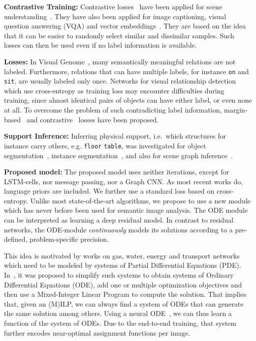 \documentclass[runningheads]{llncs}
\begin{document}
\noindent \textbf{Contrastive Training:} Contrastive losses~\cite{arora2019theoretical} have been applied for scene understanding~\cite{Zhang2019:GCL}. They have also been applied for image captioning, visual question answering (VQA) and vector embeddings~\cite{yang2018shuffle,nagaraja2016modeling,rohrbach2016grounding}. They are based on the idea that it can be easier to randomly select similar and dissimilar samples. Such losses can then be used even if no label information is available.

\noindent \textbf{Losses:} In Visual Genome~\cite{krishna2017visual}, many semantically meaningful relations are not labeled. Furthermore, relations that can have multiple labels, for instance \texttt{on} and \texttt{sit}, are usually labeled only once. Networks for visual relationship detection which use cross-entropy as training loss may encounter difficulties during training, since almost identical pairs of objects can have either label, or even none at all. 
To overcome the problem of such contradicting label information, margin-based~\cite{krishnaswamy2019combining} and contrastive~\cite{Zhang2019:GCL} losses have been proposed.

\noindent \textbf{Support Inference:} Inferring physical support, i.e.~which structures for instance carry others, e.g. \texttt{floor}  \texttt{table}, was investigated for object segmentation~\cite{Silberman2012:SupportInference}, instance segmentation~\cite{zhuo2017indoor}, and also for scene graph inference~\cite{yang2017support}.

\noindent \textbf{Proposed model:} The proposed model uses neither iterations, except for LSTM-cells, nor message passing, nor a Graph CNN. As most recent works do, language priors are included. We further use a standard loss based on cross-entropy. Unlike most state-of-the-art algorithms, we propose to use a new module which has never before been used for semantic image analysis. The ODE module~\cite{Chen2018:NODE} can be interpreted as learning a deep residual model. In contrast to residual networks, the ODE-module \emph{continuously} models its solutions according to a pre-defined, problem-specific precision. 

This idea is motivated by works on gas, water, energy and transport networks which need to be modeled by systems of Partial Differential Equations (PDE). In~\cite{Fuegenschuh2006:CombinatorialModels}, it was proposed to simplify such systems to obtain systems of Ordinary Differential Equations (ODE), add one or multiple optimization objectives and then use a Mixed-Integer Linear Program to compute the solution. That implies that, given an (M)ILP, we can always find a system of ODEs that can generate the same solution among others. Using a neural ODE~\cite{Chen2018:NODE}, we can thus learn a function of the system of ODEs. Due to the end-to-end training, that system further encodes  near-optimal assignment functions per image.
\end{document}
